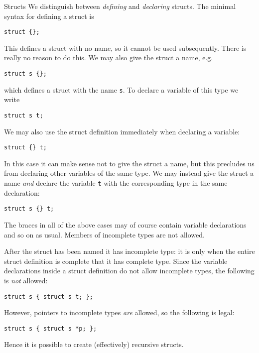 \documentclass[article, a4paper, 11pt, oneside]{memoir}
\numberwithin{equation}{chapter}
\newcommand{\inlinecode}[1]{\colorbox{lightgray}{\vphantom{\texttt{jk}}\lstinline$#1$}}
\renewcommand{\inlinecode}{\lstinline}
\begin{document}
\begin{notelist}
\item[Structs]
We distinguish between \emph{defining} and \emph{declaring} structs. The minimal syntax for defining a struct is
%
\begin{displayquote}
    \lstinline|struct {};|
\end{displayquote}
%
This defines a struct with no name, so it cannot be used subsequently. There is really no reason to do this. We may also give the struct a name, e.g.
%
\begin{displayquote}
    \lstinline|struct s {};|
\end{displayquote}
%
which defines a struct with the name \inlinecode{s}. To declare a variable of this type we write
%
\begin{displayquote}
    \lstinline{struct s t;}
\end{displayquote}
%
We may also use the struct definition immediately when declaring a variable:
%
\begin{displayquote}
    \lstinline|struct {} t;|
\end{displayquote}
%
In this case it can make sense not to give the struct a name, but this precludes us from declaring other variables of the same type. We may instead give the struct a name \emph{and} declare the variable \inlinecode{t} with the corresponding type in the same declaration:
%
\begin{displayquote}
    \lstinline|struct s {} t;|
\end{displayquote}
%
The braces in all of the above cases may of course contain variable declarations and so on as usual. Members of incomplete types are not allowed.

After the struct has been named it has incomplete type: it is only when the entire struct definition is complete that it has complete type. Since the variable declarations inside a struct definition do not allow incomplete types, the following is \emph{not} allowed:
%
\begin{displayquote}
    \lstinline|struct s { struct s t; };|
\end{displayquote}
%
However, pointers to incomplete types \emph{are} allowed, so the following is legal:
%
\begin{displayquote}
    \lstinline|struct s { struct s *p; };|
\end{displayquote}
%
Hence it is possible to create (effectively) recursive structs.


\end{notelist}
\end{document}
